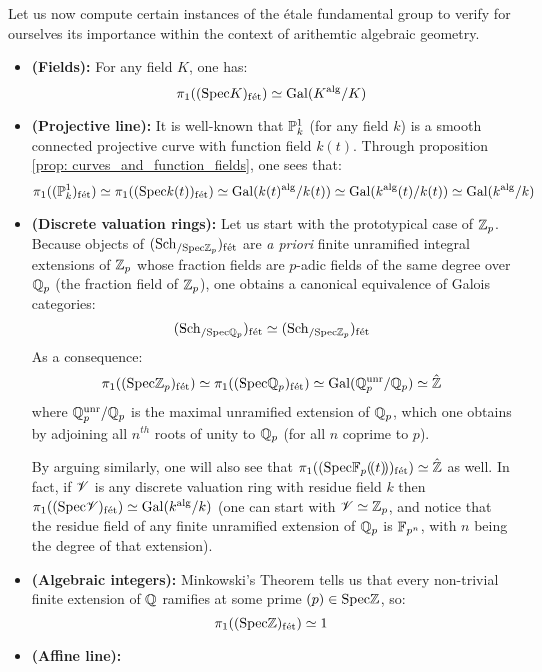         Let us now compute certain instances of the \'etale fundamental group to verify for ourselves its importance within the context of arithemtic algebraic geometry.
        \begin{example} \label{example: etale_fundamental_groups}
            \noindent
            \begin{itemize}
                \item \textbf{(Fields):} For any field $K$, one has:
                    $$\pi_1((\Spec K)_{\fet}) \cong \Gal(K^{\alg}/K)$$
                \item \textbf{(Projective line):} It is well-known that $\P^1_k$ (for any field $k$) is a smooth connected projective curve with function field $k(t)$. Through proposition \ref{prop: curves_and_function_fields}, one sees that:
                    $$\pi_1((\P^1_k)_{\fet}) \cong \pi_1((\Spec k(t))_{\fet}) \cong \Gal(k(t)^{\alg}/k(t)) \cong \Gal(k^{\alg}(t)/k(t)) \cong \Gal(k^{\alg}/k)$$
                \item \textbf{(Discrete valuation rings):} Let us start with the prototypical case of $\Z_p$. Because objects of $(\Sch_{/\Spec \Z_p})_{\fet}$ are \textit{a priori} finite unramified integral extensions of $\Z_p$ whose fraction fields are $p$-adic fields of the same degree over $\Q_p$ (the fraction field of $\Z_p$), one obtains a canonical equivalence of Galois categories:
                    $$(\Sch_{/\Spec \Q_p})_{\fet} \cong (\Sch_{/\Spec \Z_p})_{\fet}$$
                As a consequence:
                    $$\pi_1((\Spec \Z_p)_{\fet}) \cong \pi_1((\Spec \Q_p)_{\fet}) \cong \Gal(\Q_p^{\unr}/\Q_p) \cong \hat{\Z}$$
                where $\Q_p^{\unr}/\Q_p$ is the maximal unramified extension of $\Q_p$, which one obtains by adjoining all $n^{th}$ roots of unity to $\Q_p$ (for all $n$ coprime to $p$).
                
                By arguing similarly, one will also see that $\pi_1((\Spec \F_p(\!(t)\!))_{\fet}) \cong \hat{\Z}$ as well. In fact, if $\scrV$ is any discrete valuation ring with residue field $k$ then $\pi_1((\Spec \scrV)_{\fet}) \cong \Gal(k^{\alg}/k)$ (one can start with $\scrV \cong \Z_p$, and notice that the residue field of any finite unramified extension of $\Q_p$ is $\F_{p^n}$, with $n$ being the degree of that extension).
                \item \textbf{(Algebraic integers):} Minkowski's Theorem tells us that every non-trivial finite extension of $\Q$ ramifies at some prime $(p) \in \Spec \Z$, so:
                    $$\pi_1((\Spec \Z)_{\fet}) \cong 1$$
                \item \textbf{(Affine line):} 
            \end{itemize}
        \end{example}
    
